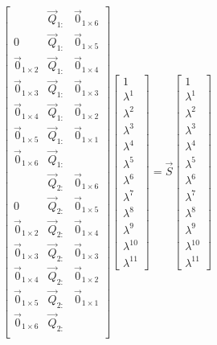 \documentclass[oneside, 11pt]{book}
\begin{document}
\begin{equation}
    \begin{bmatrix}
        & \vec{Q}_{1:} & \vec{0}_{1\times 6} \\
        0 & \vec{Q}_{1:} & \vec{0}_{1\times 5} \\
        \vec{0}_{1\times 2} & \vec{Q}_{1:} & \vec{0}_{1\times 4} \\
        \vec{0}_{1\times 3} & \vec{Q}_{1:} & \vec{0}_{1\times 3} \\
        \vec{0}_{1\times 4} & \vec{Q}_{1:} & \vec{0}_{1\times 2} \\
        \vec{0}_{1\times 5} & \vec{Q}_{1:} & \vec{0}_{1\times 1} \\
        \vec{0}_{1\times 6} & \vec{Q}_{1:} & \\
        & \vec{Q}_{2:} & \vec{0}_{1\times 6} \\
        0 & \vec{Q}_{2:} & \vec{0}_{1\times 5} \\
        \vec{0}_{1\times 2} & \vec{Q}_{2:} & \vec{0}_{1\times 4} \\
        \vec{0}_{1\times 3} & \vec{Q}_{2:} & \vec{0}_{1\times 3} \\
        \vec{0}_{1\times 4} & \vec{Q}_{2:} & \vec{0}_{1\times 2} \\
        \vec{0}_{1\times 5} & \vec{Q}_{2:} & \vec{0}_{1\times 1} \\
        \vec{0}_{1\times 6} & \vec{Q}_{2:} & \\
    \end{bmatrix}
    \begin{bmatrix}
        1 \\
        \lambda^1 \\
        \lambda^2 \\
        \lambda^3 \\
        \lambda^4 \\
        \lambda^5 \\
        \lambda^6 \\
        \lambda^7 \\
        \lambda^8 \\
        \lambda^9 \\
        \lambda^{10} \\
        \lambda^{11}
    \end{bmatrix}
    =
    \vec{S}
    \begin{bmatrix}
        1 \\
        \lambda^1 \\
        \lambda^2 \\
        \lambda^3 \\
        \lambda^4 \\
        \lambda^5 \\
        \lambda^6 \\
        \lambda^7 \\
        \lambda^8 \\
        \lambda^9 \\
        \lambda^{10} \\
        \lambda^{11}
    \end{bmatrix}
    \label{eqn:inhomog_poly}
\end{equation}
\end{document}
